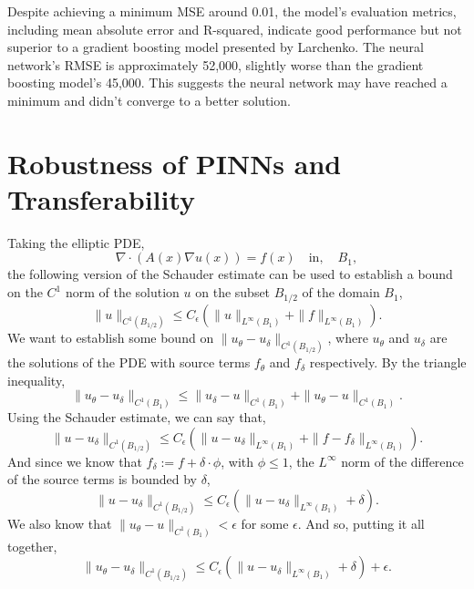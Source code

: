 \documentclass[unicode,11pt,a4paper,oneside,numbers=endperiod,openany]{scrartcl}
\begin{document}
Despite achieving a minimum MSE around 0.01, the model's evaluation metrics, including mean absolute error and R-squared, indicate good performance but not superior to a gradient boosting model presented by Larchenko. The neural network's RMSE is approximately 52,000, slightly worse than the gradient boosting model's 45,000. This suggests the neural network may have reached a minimum and didn't converge to a better solution.

\section{Robustness of PINNs and Transferability}\label{sec:task4}
Taking the elliptic PDE,
\begin{equation}
    \nabla \cdot (A(x) \nabla u(x)) = f(x) \quad \text{in} ,\quad B_1,
\end{equation}
the following version of the Schauder estimate can be used to establish a bound
on the $C^1$ norm of the solution $u$ on the subset $B_{1/2}$ of the domain $B_1$,
\begin{equation}
    \|u\|_{C^1(B_{1/2})} \leq C_{\epsilon} (\|u\|_{L^\infty(B_1)} + \|f\|_{L^\infty(B_1)}).
\end{equation}
We want to establish some bound on $\|u_\theta - u_{\delta}\|_{C^1(B_{1/2})}$,
where $u_\theta$ and $u_\delta$ are the solutions of the PDE with source terms
$f_\theta$ and $f_\delta$ respectively.
By the triangle inequality,
\begin{equation}
    \|u_\theta - u_\delta\|_{C^1(B_1)} \leq  \|u_\delta - u \|_{C^1(B_1)} +  \|u_\theta - u \|_{C^1(B_1)}.
\end{equation}
Using the Schauder estimate, we can say that,
\begin{equation}
    \|u - u_\delta\|_{C^1(B_{1/2})} \leq C_{\epsilon} (\|u - u_\delta\|_{L^\infty(B_1)} + \|f - f_\delta\|_{L^\infty(B_1)}).
\end{equation}
And since we know that $f_\delta := f + \delta \cdot \phi$, with $\phi \leq 1$,
the $L^\infty$ norm of the difference of the source terms is bounded by $\delta$, 
\begin{equation}
    \|u - u_\delta\|_{C^1(B_{1/2})} \leq C_{\epsilon} (\|u - u_\delta\|_{L^\infty(B_1)} + \delta).
\end{equation}
We also know that $\|u_\theta - u\|_{C^1(B_1)} < \epsilon$ for some $\epsilon$. And so, putting it all together,
\begin{equation}
    \|u_\theta - u_\delta\|_{C^1(B_{1/2})} \leq  C_{\epsilon} (\|u - u_\delta\|_{L^\infty(B_1)} + \delta) + \epsilon.
\end{equation}
\end{document}
